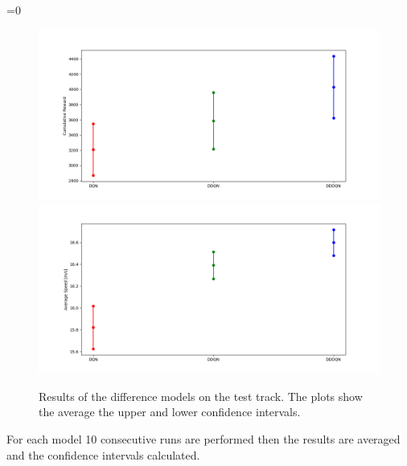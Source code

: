 \documentclass[14pt]{extarticle}
\newcounter{debug}
\begin{document}
\begin{flushleft}
\ifnum\value{debug}=0 {
	\begin{figure}[H]
    		\centering\includegraphics[width=1\textwidth]{./Image/Results/Test/rewards.png}
    		\vspace{-5mm}
    		\centering\includegraphics[width=1\textwidth]{./Image/Results/Test/speeds.png}
		\caption{Results of the difference models on the test track. The plots show the average the upper and lower confidence intervals.}
	\end{figure}
	}\fi
	
\begin{table}[H]
		\centering
		\caption{Result obtained during the evaluation of the models on the complex track.}
		\label{tab:table-test}
	\end{table}
	
	For each model 10 consecutive runs are performed then the results are averaged and the confidence intervals calculated.

\end{flushleft}
\end{document}
